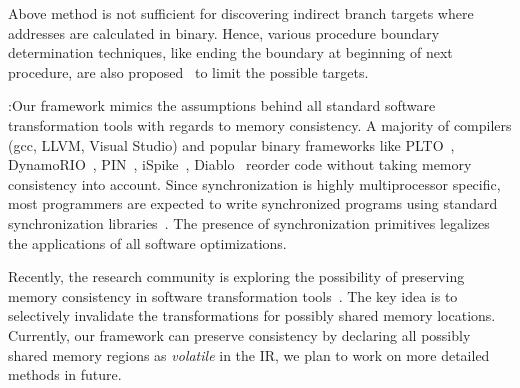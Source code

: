 Above method is not sufficient for discovering indirect branch targets where addresses are calculated in binary. Hence, various procedure boundary determination techniques, like ending the boundary at beginning of next procedure, are also proposed~\cite{matt-patent10} to limit the possible targets.

\underline{}:Our framework mimics the assumptions behind all standard software transformation tools with regards to memory consistency. A majority of compilers (gcc, LLVM, Visual Studio) and popular binary frameworks like PLTO~\cite{plto}, DynamoRIO~\cite{bruening2004eta}, PIN~\cite{pintool}, iSpike~\cite{ispike}, Diablo~\cite{Diablo1} reorder code without taking memory consistency into account. Since synchronization is highly multiprocessor specific, most programmers are expected to write synchronized programs using standard synchronization libraries~\cite{SC-compiler}. The presence of synchronization primitives legalizes the applications of all software optimizations.

Recently, the research community is exploring the possibility of preserving memory consistency in software transformation tools~\cite{SC-compiler}. The key idea is to selectively invalidate the transformations for possibly shared memory locations. Currently, our framework can preserve consistency by declaring all possibly shared memory regions as \emph{volatile} in the IR, we plan to work on more detailed  methods in future.

